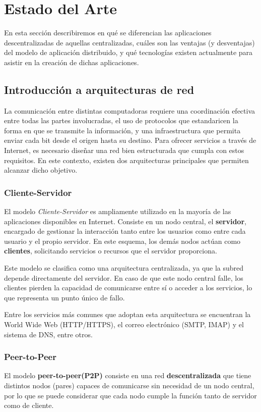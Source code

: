 \section{Estado del Arte}
En esta sección describiremos en qué se diferencian las aplicaciones descentralizadas de aquellas centralizadas, cuáles son las ventajas (y desventajas) del modelo de aplicación distribuido, y qué tecnologías existen actualmente para asistir en la creación de dichas aplicaciones. 

\subsection{Introducción a arquitecturas de red}
La comunicación entre distintas computadoras requiere una coordinación efectiva entre todas las partes involucradas, el uso de protocolos que estandaricen la forma en que se transmite la información, y una infraestructura que permita enviar cada bit desde el origen hasta su destino. Para ofrecer servicios a través de Internet, es necesario diseñar una red bien estructurada que cumpla con estos requisitos. En este contexto, existen dos arquitecturas principales que permiten alcanzar dicho objetivo.

\subsubsection*{Cliente-Servidor}

El modelo \textit{Cliente-Servidor} es ampliamente utilizado en la mayoría de las aplicaciones disponibles en Internet. Consiste en un nodo central, el \textbf{servidor}, encargado de gestionar la interacción tanto entre los usuarios como entre cada usuario y el propio servidor. En este esquema, los demás nodos actúan como \textbf{clientes}, solicitando servicios o recursos que el servidor proporciona.

Este modelo se clasifica como una arquitectura centralizada, ya que la subred depende directamente del servidor. En caso de que este nodo central falle, los clientes pierden la capacidad de comunicarse entre sí o acceder a los servicios, lo que representa un punto único de fallo.

Entre los servicios más comunes que adoptan esta arquitectura se encuentran la World Wide Web (HTTP/HTTPS), el correo electrónico (SMTP, IMAP) y el sistema de DNS, entre otros.

\subsubsection*{Peer-to-Peer}
El modelo \textbf{peer-to-peer(P2P)} consiste en una red \textbf{descentralizada} que tiene distintos nodos (pares) capaces de comunicarse sin necesidad de un nodo central, por lo que se puede considerar que cada nodo cumple la función tanto de servidor como de cliente.

